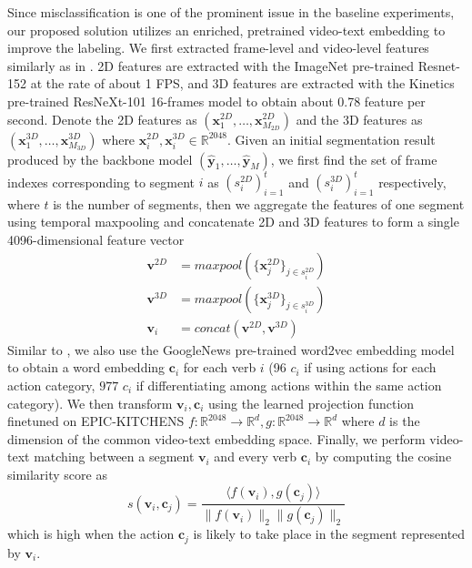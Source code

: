 Since misclassification is one of the prominent issue in the baseline experiments, our proposed solution utilizes an enriched, pretrained video-text embedding to improve the labeling. We first extracted frame-level and video-level features similarly as in . 2D features are extracted with the ImageNet pre-trained Resnet-152 \cite{7780459} at the rate of about 1 FPS, and 3D features are extracted with the Kinetics \cite{8099985} pre-trained ResNeXt-101 16-frames model \cite{8578783} to obtain about 0.78 feature per second. Denote the 2D features as $(\mathbf{x}^{2D}_1,\dots,\mathbf{x}^{2D}_{M_{2D}})$ and the 3D features as $(\mathbf{x}^{3D}_1,\dots,\mathbf{x}^{3D}_{M_{3D}})$ where $\mathbf{x}^{2D}_i,\mathbf{x}^{3D}_i\in\mathbb{R}^{2048}$.
Given an initial segmentation result produced by the backbone model $(\hat{\mathbf{y}}_1,\dots,\hat{\mathbf{y}}_M)$, we first find the set of frame indexes corresponding to segment $i$ as $(s_i^{2D})_{i=1}^t$ and $(s_i^{3D})_{i=1}^t$ respectively, where $t$ is the number of segments, then we aggregate the features of one segment using temporal maxpooling and concatenate 2D and 3D features to form a single 4096-dimensional feature vector
\begin{align*}
    \mathbf{v}^{2D}&=maxpool(\{\mathbf{x}_j^{2D}\}_{j\in s_i^{2D}})\\
    \mathbf{v}^{3D}&=maxpool(\{\mathbf{x}_j^{3D}\}_{j\in s_i^{3D}})\\
    \mathbf{v}_i&=concat(\mathbf{v}^{2D},\mathbf{v}^{3D})
\end{align*}
Similar to , we also use the GoogleNews pre-trained word2vec embedding model to obtain a word embedding $\mathbf{c}_i$ for each verb $i$ (96 $c_i$ if using actions for each action category, $977$ $c_i$ if differentiating among actions within the same action category). We then transform $\mathbf{v}_i,\mathbf{c}_i$ using the learned projection function finetuned on EPIC-KITCHENS $f:\mathbb{R}^{2048}\to\mathbb{R}^d,g:\mathbb{R}^{2048}\to\mathbb{R}^d$ where $d$ is the dimension of the common video-text embedding space. Finally, we perform video-text matching between a segment $\mathbf{v}_i$ and every verb $\mathbf{c}_i$ by computing the cosine similarity score as
\[s(\mathbf{v}_i,\mathbf{c}_j)=\frac{\langle f(\mathbf{v}_i),g(\mathbf{c}_j)\rangle}{\|f(\mathbf{v}_i)\|_2\|g(\mathbf{c}_j)\|_2}\]
which is high when the action $\mathbf{c}_j$ is likely to take place in the segment represented by $\mathbf{v}_i$.

